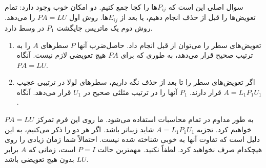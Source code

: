 \documentclass[12pt, a4paper]{book}
\begin{document}
	سوال اصلی این است که $P_{ij}$ها را کجا جمع کنیم. دو امکان خوب وجود دارد: تمام تعویض‌ها را قبل از حذف انجام دهیم، یا بعد از $E_{ij}$ها. روش اول $PA=LU$ را می‌دهد. روش دوم یک ماتریس جایگشت $P_1$ در وسط دارد.
	\begin{enumerate}
		\item تعویض‌های سطر را می‌توان از قبل انجام داد. حاصل‌ضرب آنها $P$ سطرهای $A$ را به ترتیب صحیح قرار می‌دهد، به طوری که برای $PA$ هیچ تعویضی لازم نیست. آنگاه $PA=LU$.
		\item اگر تعویض‌های سطر را تا بعد از حذف نگه داریم، سطرهای لولا در ترتیبی عجیب قرار دارند. $P_1$ آنها را در ترتیب مثلثی صحیح در $U_1$ قرار می‌دهد. آنگاه $A=L_1P_1U_1$.
	\end{enumerate}
	$PA=LU$ به طور مداوم در تمام محاسبات استفاده می‌شود. ما روی این فرم تمرکز خواهیم کرد.
	تجزیه $A=L_1P_1U_1$ شاید زیباتر باشد. اگر هر دو را ذکر می‌کنیم، به این دلیل است که تفاوت آنها به خوبی شناخته شده نیست. احتمالاً شما زمان زیادی را روی هیچکدام صرف نخواهید کرد. لطفاً نکنید. مهمترین حالت $P=I$ است، زمانی که $A$ برابر $LU$ بدون هیچ تعویضی باشد.
	
\end{document}
